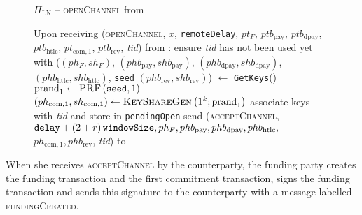   \begin{figure}[H]
    \begin{protocolbox}{$\Pi_{\mathrm{LN}}$ -- \textsc{openChannel} from \bob}
      \begin{algorithmic}[1]
        \State Upon receiving (\textsc{openChannel}, $x$, \texttt{remoteDelay},
        $pt_F$, $ptb_{\mathrm{pay}}$, $ptb_{\mathrm{dpay}}$,
        $ptb_{\mathrm{htlc}}$, $pt_{\mathrm{com}, 1}$, $ptb_{\mathrm{rev}}$,
        \textit{tid}) from \bob:
        \Indent
          \State ensure \textit{tid} has not been used yet with \bob
          \State ($(ph_F, sh_F)$, $(phb_{\mathrm{pay}}, shb_{\mathrm{pay}})$,
          $(phb_{\mathrm{dpay}}, shb_{\mathrm{dpay}})$, $(phb_{\mathrm{htlc}},
          shb_{\mathrm{htlc}})$, \texttt{seed} $(phb_{\mathrm{rev}},
          shb_{\mathrm{rev}})$) $\gets$ \texttt{GetKeys}()
          \State $\mathrm{prand}_1 \gets \textsc{PRF}\left(\mathtt{seed},
          1\right)$
          \label{alg:protocol:open:peer:prf}
          \State $\left(ph_{\mathrm{com}, 1}, sh_{\mathrm{com}, 1}\right) \gets
          \textsc{KeyShareGen}\left(1^k; \mathrm{prand}_1\right)$
          \State associate keys with \textit{tid} and store in
          \texttt{pendingOpen}
          \label{alg:protocol:open:openChannel:pendingOpen}
          \State send (\textsc{acceptChannel}, $\mathtt{delay}  + \left(2 + r\right)\texttt{windowSize},
          ph_F, phb_{\mathrm{pay}}, phb_{\mathrm{dpay}}, phb_{\mathrm{htlc}},$
          $ph_{\mathrm{com}, 1}, phb_{\mathrm{rev}}$, \textit{tid}) to \bob{}
        \EndIndent
      \end{algorithmic}
    \end{protocolbox}
    \caption{}
    \label{alg:protocol:open:openChannel}
  \end{figure}

  When she receives \textsc{acceptChannel} by the counterparty, the funding
  party creates the funding transaction and the first commitment transaction,
  signs the funding transaction and sends this signature to the counterparty
  with a message labelled \textsc{fundingCreated}.

